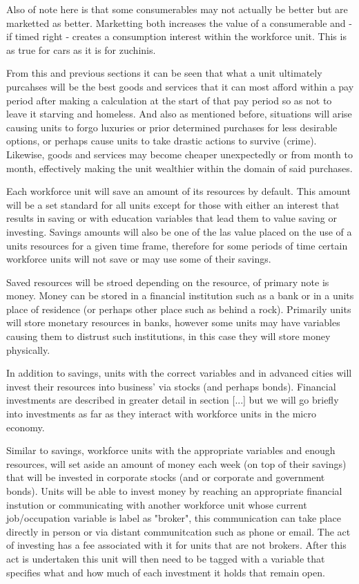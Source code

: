 Also of note here is that some consumerables may not actually be better but are marketted as better. Marketting both increases the value of a consumerable and - if timed right - creates a consumption interest within the workforce unit. This is as true for cars as it is for zuchinis.   

From this and previous sections it can be seen that what a unit ultimately purcahses will be the best goods and services that it can most afford within a pay period after making a calculation at the start of that pay period so as not to leave it starving and homeless. And also as mentioned before, situations will arise causing units to forgo luxuries or prior determined purchases for less desirable options, or perhaps cause units to take drastic actions to survive (crime). Likewise, goods and services may become cheaper unexpectedly or from month to month, effectively making the unit wealthier within the domain of said purchases.

Each workforce unit will save an amount of its resources by default. This amount will be a set standard for all units except for those with either an interest that results in saving or with education variables that lead them to value saving or investing. Savings amounts will also be one of the las value placed on the use of a units resources for a given time frame, therefore for some periods of time certain workforce units will not save or may use some of their savings.

Saved resources will be stroed depending on the resource, of primary note is money. Money can be stored in a financial institution such as a bank or in a units place of residence (or perhaps other place such as behind a rock). Primarily units will store monetary resources in banks, however some units may have variables causing them to distrust such institutions, in this case they will store money physically. 


In addition to savings, units with the correct variables and in advanced cities will invest their resources into business' via stocks (and perhaps bonds). Financial investments are described in greater detail in section [...] but we will go briefly into investments as far as they interact with workforce units in the micro economy.

Similar to savings, workforce units with the appropriate variables and enough resources, will set aside an amount of money each week (on top of their savings) that will be invested in corporate stocks  (and or corporate and government bonds). Units will be able to invest money by reaching an appropriate financial instution or communicating with another workforce unit whose current job/occupation variable is label as "broker", this communication can take place directly in person or via distant communitcation such as phone or email. The act of investing has a fee associated with it for units that are not brokers. After this act is undertaken this unit will then need to be tagged with a variable that specifies what and how much of each investment it holds that remain open.     

